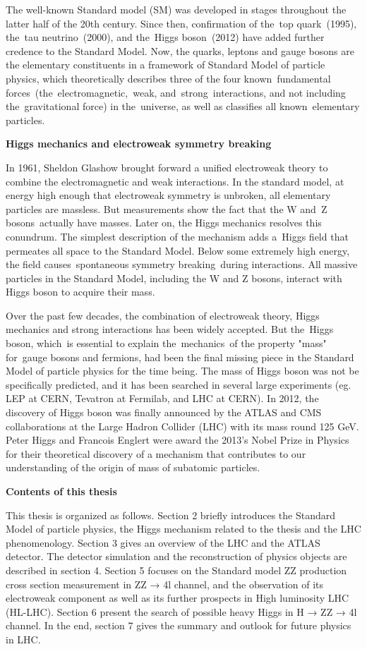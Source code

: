 The well-known Standard model (SM) was developed in stages throughout the latter half of the 20th century. Since then, confirmation of the top quark (1995), the tau neutrino (2000), and the Higgs boson (2012) have added further credence to the Standard Model.
Now, the quarks, leptons and gauge bosons are the elementary constituents in a framework of Standard Model of particle physics, which theoretically describes three of the four known fundamental forces (the electromagnetic, weak, and strong interactions, and not including the gravitational force) in the universe, as well as classifies all known elementary particles.

\textbf{Higgs mechanics and electroweak symmetry breaking}

In 1961, Sheldon Glashow brought forward a unified electroweak theory to combine the electromagnetic and weak interactions. In the standard model, at energy high enough that electroweak symmetry is unbroken, all elementary particles are massless. But measurements show the fact that the W and Z bosons actually have masses. Later on, the Higgs mechanics resolves this conundrum. The simplest description of the mechanism adds a Higgs field that permeates all space to the Standard Model. Below some extremely high energy, the field causes spontaneous symmetry breaking during interactions. All massive particles in the Standard Model, including the W and Z bosons, interact with Higgs boson to acquire their mass.

Over the past few decades, the combination of electroweak theory, Higgs mechanics and strong interactions has been widely accepted. But the Higgs boson, which is essential to explain the mechanics of the property "mass" for gauge bosons and fermions, had been the final missing piece in the Standard Model of particle physics for the time being. The mass of Higgs boson was not be specifically predicted, and it has been searched in several large experiments (eg. LEP at CERN, Tevatron at Fermilab, and LHC at CERN). In 2012, the discovery of Higgs boson was finally announced by the ATLAS and CMS collaborations at the Large Hadron Collider (LHC) with its mass round 125 GeV. Peter Higgs and Francois Englert were award the 2013’s Nobel Prize in Physics for their theoretical discovery of a mechanism that contributes to our understanding of the origin of mass of subatomic particles.

\textbf{Contents of this thesis}

This thesis is organized as follows. Section 2 briefly introduces the Standard Model of particle physics, the Higgs mechanism related to the thesis and the LHC phenomenology. Section 3 gives an overview of the LHC and the ATLAS detector. The detector simulation and the reconstruction of physics objects are described in section 4. Section 5 focuses on the Standard model ZZ production cross section measurement in ZZ → 4l channel, and the observation of its electroweak component as well as its further prospects in High luminosity LHC (HL-LHC). Section 6 present the search of possible heavy Higgs in H → ZZ → 4l channel. In the end, section 7 gives the summary and outlook for future physics in LHC.


